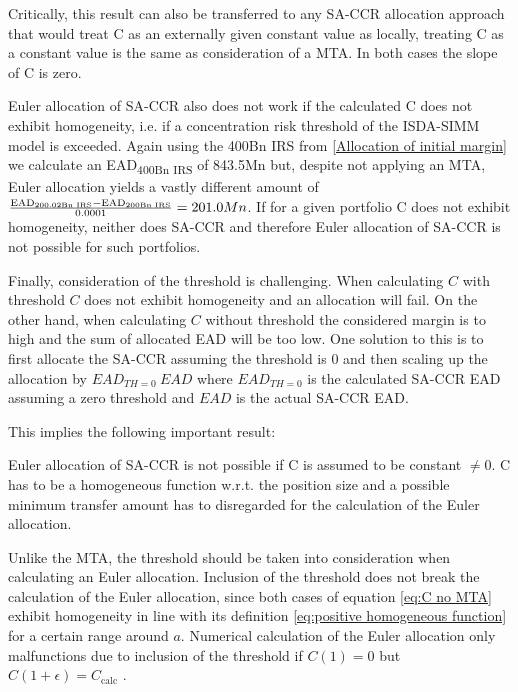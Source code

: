 \documentclass[../Thesis_AHoecherl.tex]{subfiles}
\begin{document}
    Critically, this result can also be transferred to any SA-CCR allocation approach that would treat C as an externally given constant value as locally, treating C as a constant value is the same as consideration of a \gls{MTA}. 
    In both cases the slope of C is zero. 
    
    Euler allocation of SA-CCR also does not work if the calculated C does not exhibit homogeneity, i.e. if a concentration risk threshold of the ISDA-SIMM model is exceeded. Again using the 400Bn IRS from \ref{Allocation of initial margin} we calculate an EAD\textsubscript{400Bn IRS} of 843.5Mn but, despite not applying an MTA, Euler allocation yields a vastly different amount of $ \frac{\text{EAD\textsubscript{200.02Bn IRS}}-\text{EAD\textsubscript{200Bn IRS}}}{0.0001} = 201.0Mn $. If for a given portfolio C does not exhibit homogeneity, neither does SA-CCR and therefore Euler allocation of SA-CCR is not possible for such portfolios.

    Finally, consideration of the threshold is challenging. When calculating $C$ with threshold $C$ does not exhibit homogeneity and an allocation will fail. On the other hand, when calculating $C$ without threshold the considered margin is to high and the sum of allocated EAD will be too low.
    One solution to this is to first allocate the SA-CCR assuming the threshold is 0 and then scaling up the allocation by $EAD_{TH = 0} \ EAD$ where $EAD_{TH = 0}$ is the calculated SA-CCR EAD assuming a zero threshold and $EAD$ is the actual SA-CCR EAD.

    

    This implies the following important result:
    
    Euler allocation of SA-CCR is not possible if C is assumed to be constant $\neq 0$. C has to be a homogeneous function w.r.t. the position size and a possible minimum transfer amount has to disregarded for the calculation of the Euler allocation.

    Unlike the \gls{MTA}, the threshold should be taken into consideration when calculating an Euler allocation. 
    Inclusion of the threshold does not break the calculation of the Euler allocation, since both cases of equation \ref{eq:C no MTA} exhibit homogeneity in line with its definition \ref{eq:positive homogeneous function} for a certain range around $a$. 
    Numerical calculation of the Euler allocation only malfunctions due to inclusion of the threshold if $C(1) = 0$ but $C(1+\epsilon) = C_{\text{calc}}$ .
\end{document}
